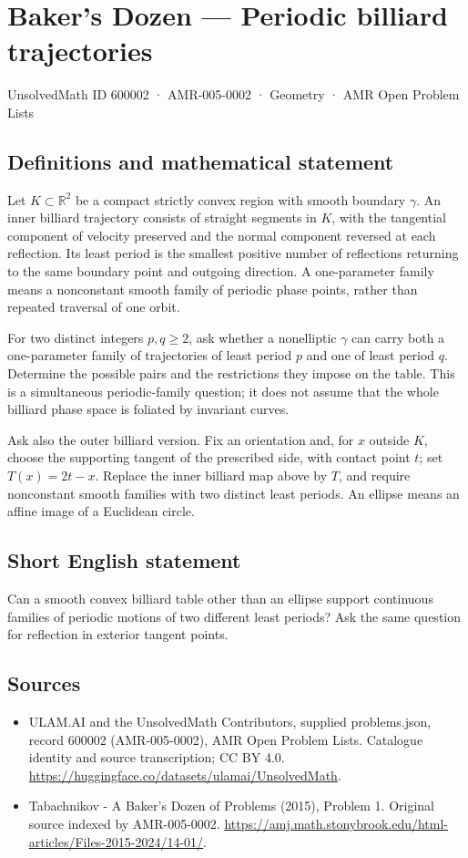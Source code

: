 \documentclass[11pt,a4paper]{article}
\begin{document}
\section*{Baker's Dozen — Periodic billiard trajectories}\label{600002}
{\small UnsolvedMath ID 600002 · AMR-005-0002 · Geometry · AMR Open Problem Lists}
\subsection{Definitions and mathematical statement}
Let $K\subset\mathbb R^2$ be a compact strictly convex region with smooth boundary
$\gamma$. An inner billiard trajectory consists of straight segments in $K$,
with the tangential component of velocity preserved and the normal component
reversed at each reflection. Its least period is the smallest positive number
of reflections returning to the same boundary point and outgoing direction.
A one-parameter family means a nonconstant smooth family of periodic phase
points, rather than repeated traversal of one orbit.

For two distinct integers $p,q\ge2$, ask whether a nonelliptic $\gamma$ can carry
both a one-parameter family of trajectories of least period $p$ and one of
least period $q$. Determine the possible pairs and the restrictions they impose
on the table. This is a simultaneous periodic-family question; it does not
assume that the whole billiard phase space is foliated by invariant curves.

Ask also the outer billiard version. Fix an orientation and, for $x$ outside
$K$, choose the supporting tangent of the prescribed side, with contact point
$t$; set $T(x)=2t-x$. Replace the inner billiard map above by $T$, and require
nonconstant smooth families with two distinct least periods. An ellipse means
an affine image of a Euclidean circle.
\subsection{Short English statement}
Can a smooth convex billiard table other than an ellipse support continuous
families of periodic motions of two different least periods? Ask the same
question for reflection in exterior tangent points.
\subsection{Sources}
\begin{itemize}
\item[S1] ULAM.AI and the UnsolvedMath Contributors, supplied problems.json, record 600002 (AMR-005-0002), AMR Open Problem Lists. Catalogue identity and source transcription; CC BY 4.0.
\url{https://huggingface.co/datasets/ulamai/UnsolvedMath}.
\item[S2] Tabachnikov - A Baker's Dozen of Problems (2015), Problem 1. Original source indexed by AMR-005-0002.
\url{https://amj.math.stonybrook.edu/html-articles/Files-2015-2024/14-01/}.
\end{itemize}
\end{document}
